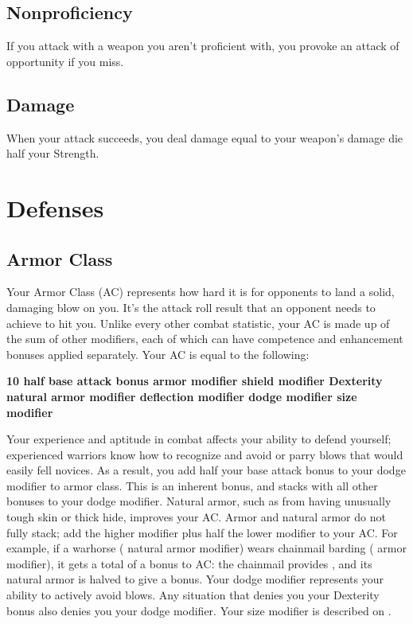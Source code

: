 \subsection{Nonproficiency}
If you attack with a weapon you aren't proficient with, you provoke an attack of opportunity if you miss.

\subsection{Damage}
When your attack succeeds, you deal damage equal to your weapon's damage die \add half your Strength.

\section{Defenses}

\subsection{Armor Class}
Your Armor Class (AC) represents how hard it is for opponents to land a solid, damaging blow on you. It's the attack roll result that an opponent needs to achieve to hit you. Unlike every other combat statistic, your AC is made up of the sum of other modifiers, each of which can have competence and enhancement bonuses applied separately. Your AC is equal to the following:

{\centering \textbf{10 \add half base attack bonus \add armor modifier \add shield modifier \add Dexterity \add natural armor modifier \add deflection modifier \add dodge modifier \add size modifier}}

 Your experience and aptitude in combat affects your ability to defend yourself; experienced warriors know how to recognize and avoid or parry blows that would easily fell novices. As a result, you add half your base attack bonus to your dodge modifier to armor class. This is an inherent bonus, and stacks with all other bonuses to your dodge modifier.
 Natural armor, such as from having unusually tough skin or thick hide, improves your AC. Armor and natural armor do not fully stack; add the higher modifier plus half the lower modifier to your AC. For example, if a warhorse ( natural armor modifier) wears chainmail barding ( armor modifier), it gets a total of a  bonus to AC: the chainmail provides , and its natural armor is halved to give a  bonus.
 Your dodge modifier represents your ability to actively avoid blows. Any situation that denies you your Dexterity bonus also denies you your dodge modifier.
 Your size modifier is described on .

